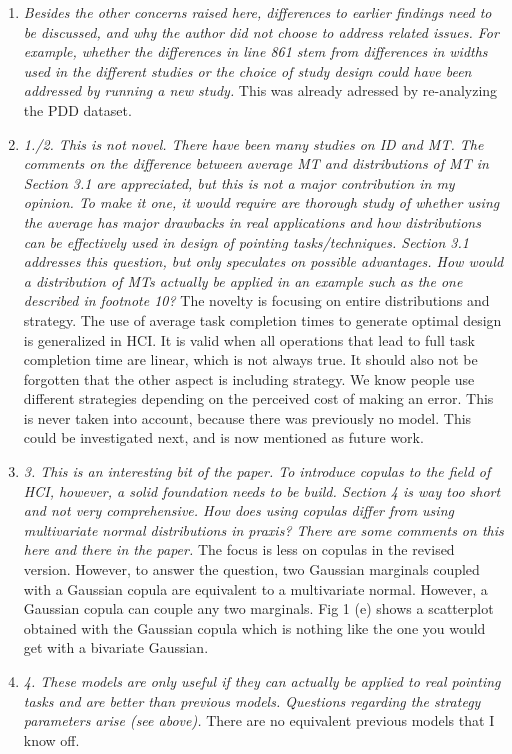 \documentclass{article}
\begin{document}
\begin{enumerate}
    \item \textit{Besides the other concerns raised here, differences to earlier findings need to be discussed, and why the author did not choose to address related issues. For example, whether the differences in line 861 stem from differences in widths used in the different studies or the choice of study design could have been addressed by running a new study. } This was already adressed by re-analyzing the PDD dataset.
    \item \textit{1./2. This is not novel. There have been many studies on ID and MT. The comments on the difference between average MT and distributions of MT in Section 3.1 are appreciated, but this is not a major contribution in my opinion. To make it one, it would require are thorough study of whether using the average has major drawbacks in real applications and how distributions can be effectively used in design of pointing tasks/techniques. Section 3.1 addresses this question, but only speculates on possible advantages. How would a distribution of MTs actually be applied in an example such as the one described in footnote 10?} The novelty is focusing on entire distributions and strategy. The use of average task completion times to generate optimal design is generalized in HCI. It is valid when all operations that lead to full task completion time are linear, which is not always true. It should also not be forgotten that the other aspect is including strategy. We know people use different strategies depending on the perceived cost of making an error. This is never taken into account, because there was previously no model. This could be investigated next, and is now mentioned as future work.
    \item \textit{3. This is an interesting bit of the paper. To introduce copulas to the field of HCI, however, a solid foundation needs to be build. Section 4 is way too short and not very comprehensive. How does using copulas differ from using multivariate normal distributions in praxis? There are some comments on this here and there in the paper.} The focus is less on copulas in the revised version. However, to answer the question, two Gaussian marginals coupled with a Gaussian copula are equivalent to a multivariate normal. However, a Gaussian copula can couple any two marginals.  Fig 1 (e) shows a scatterplot obtained with the Gaussian copula which is nothing like the one you would get with a bivariate Gaussian.
    \item \textit{4. These models are only useful if they can actually be applied to real pointing tasks and are better than previous models. Questions regarding the strategy parameters arise (see above).} There are no equivalent previous models that I know off.

\end{enumerate}
\end{document}
